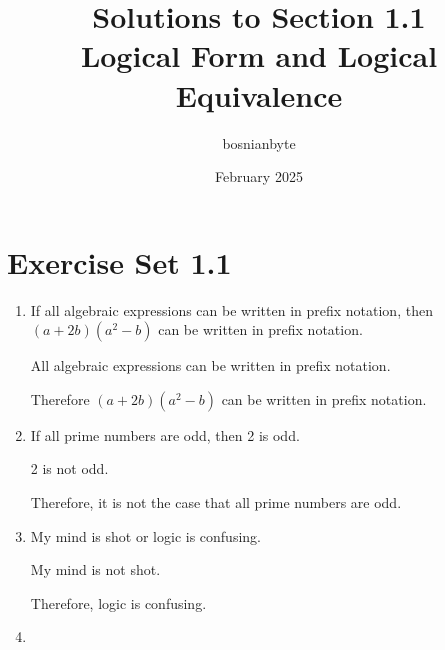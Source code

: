\documentclass{article}
\title{Solutions to Section 1.1 \\ Logical Form and Logical Equivalence}
\author{bosnianbyte}
\date{February 2025}
\begin{document}
\maketitle

\section{Exercise Set 1.1}

\begin{enumerate}[label=\textbf{\arabic*.}]
\item %
If all algebraic expressions can be written in prefix notation, then $(a + 2b)(a^2 - b)$ can be written in prefix notation.

All algebraic expressions can be written in prefix notation.

Therefore $(a + 2b)(a^2 - b)$ can be written in prefix notation.
\item %
If all prime numbers are odd, then 2 is odd.

2 is not odd.

Therefore, it is not the case that all prime numbers are odd.
\item %
My mind is shot or logic is confusing.

My mind is not shot.

Therefore, logic is confusing.
\item %


\end{enumerate}
\end{document}
